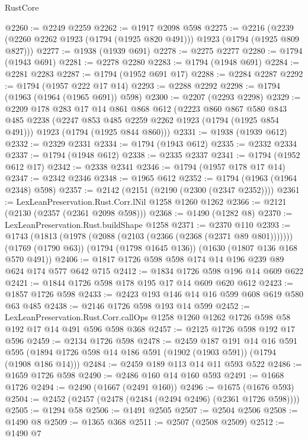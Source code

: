 \begin{lexlean}{RustCore}
\begin{coremodule}
@2260 := @2249 @2259
@2262 := @1917 @2098 @598
@2275 := @2216 (@2239 (@2260 @2262 @1923 (@1794 (@1925 @820 @491))) @1923 (@1794 (@1925 @809 @827)))
@2277 := @1938 (@1939 @691)
@2278 := @2275 @2277
@2280 := @1794 (@1943 @691)
@2281 := @2278 @2280
@2283 := @1794 (@1948 @691)
@2284 := @2281 @2283
@2287 := @1794 (@1952 @691 @17)
@2288 := @2284 @2287
@2292 := @1794 (@1957 @222 @17 @14)
@2293 := @2288 @2292
@2298 := @1794 (@1963 (@1964 (@1965 @691)) @598)
@2300 := @2207 (@2293 @2298)
@2329 := @2209
    @178
    @283
    @17
    @14
    @861
    @868
    @612
    (@2223
      @860
      @867
      @580
      @843
      @485
      @2238
      (@2247 @853 @485 @2259 @2262 @1923 (@1794 (@1925 @854 @491)))
      @1923
      (@1794 (@1925 @844 @860)))
@2331 := @1938 (@1939 @612)
@2332 := @2329 @2331
@2334 := @1794 (@1943 @612)
@2335 := @2332 @2334
@2337 := @1794 (@1948 @612)
@2338 := @2335 @2337
@2341 := @1794 (@1952 @612 @17)
@2342 := @2338 @2341
@2346 := @1794 (@1957 @178 @17 @14)
@2347 := @2342 @2346
@2348 := @1965 @612
@2352 := @1794 (@1963 (@1964 @2348) @598)
@2357 := @2142 (@2151 (@2190 (@2300 (@2347 @2352))))
@2361 := LexLeanPreservation.Rust.Corr.lNil @1258 @1260 @1262
@2366 := @2121 (@2130 (@2357 (@2361 @2098 @598)))
@2368 := @1490 (@1282 @8)
@2370 := LexLeanPreservation.Rust.buildShape @1258
@2371 := @2370 @110
@2393 := @1743
    (@1813 (@1978 (@2088 (@2103 (@2366 (@2368 (@2371 @89 @801)))))))
    (@1769 (@1790 @63))
    (@1794 (@1798 @1645 @136))
    (@1630 (@1807 @136 @168 @570 @491))
@2406 := @1817 @1726 @598 @598 @174 @14 @196 @239 @89 @624 @174 @577 @642 @715
@2412 := @1834 @1726 @598 @196 @14 @609 @622
@2421 := @1844 @1726 @598 @178 @195 @17 @14 @609 @620 @612
@2423 := @1857 @1726 @598
@2433 := @2423 @193 @146 @14 @16 @599 @608 @619 @580 @63 @485
@2438 := @2146 @1726 @598 @193 @14 @599
@2452 := LexLeanPreservation.Rust.Corr.callOps
    @1258
    @1260
    @1262
    @1726
    @598
    @58
    @192
    @17
    @14
    @491
    @596
    @598
    @368
@2457 := @2125 @1726 @598 @192 @17 @596
@2459 := @2134 @1726 @598
@2478 := @2459
    @187
    @191
    @14
    @16
    @591
    @595
    (@1894 @1726 @598 @14 @186 @591 (@1902 (@1903 @591)) (@1794 (@1908 @186 @14)))
@2484 := @2459 @189 @113 @14 @11 @593 @522
@2486 := @1659 @1726 @598
@2490 := @2486 @160 @14 @160 @593
@2491 := @1668 @1726
@2494 := @2490 (@1667 (@2491 @160))
@2496 := @1675 (@1676 @593)
@2504 := @2452 (@2457 (@2478 (@2484 (@2494 @2496) (@2361 @1726 @598))))
@2505 := @1294 @58
@2506 := @1491 @2505
@2507 := @2504 @2506
@2508 := @1490 @8
@2509 := @1365 @368
@2511 := @2507 (@2508 @2509)
@2512 := @1490 @7

\end{coremodule}
\end{lexlean}

